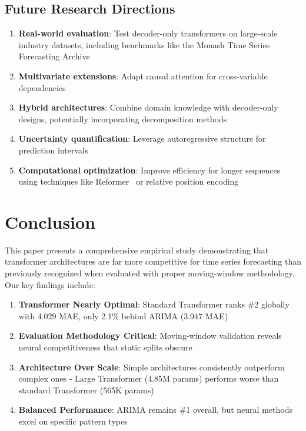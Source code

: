 \documentclass[11pt]{article}
\begin{document}
\subsection{Future Research Directions}

\begin{enumerate}
\item \textbf{Real-world evaluation}: Test decoder-only transformers on large-scale industry datasets, including benchmarks like the Monash Time Series Forecasting Archive~\cite{godahewa2021monash}
\item \textbf{Multivariate extensions}: Adapt causal attention for cross-variable dependencies
\item \textbf{Hybrid architectures}: Combine domain knowledge with decoder-only designs, potentially incorporating decomposition methods~\cite{cleveland1990stl}
\item \textbf{Uncertainty quantification}: Leverage autoregressive structure for prediction intervals
\item \textbf{Computational optimization}: Improve efficiency for longer sequences using techniques like Reformer~\cite{kitaev2020reformer} or relative position encoding~\cite{shaw2018self}
\end{enumerate}

\section{Conclusion}

This paper presents a comprehensive empirical study demonstrating that transformer architectures are far more competitive for time series forecasting than previously recognized when evaluated with proper moving-window methodology. Our key findings include:

\begin{enumerate}
\item \textbf{Transformer Nearly Optimal}: Standard Transformer ranks \#2 globally with 4.029 MAE, only 2.1\% behind ARIMA (3.947 MAE)
\item \textbf{Evaluation Methodology Critical}: Moving-window validation reveals neural competitiveness that static splits obscure
\item \textbf{Architecture Over Scale}: Simple architectures consistently outperform complex ones - Large Transformer (4.85M params) performs worse than standard Transformer (565K params)
\item \textbf{Balanced Performance}: ARIMA remains \#1 overall, but neural methods excel on specific pattern types
\end{enumerate}
\end{document}
